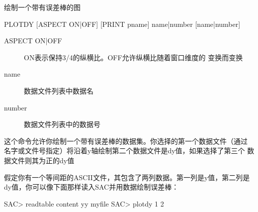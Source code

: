 \label{cmd:plotdy}

绘制一个带有误差棒的图

\begin{SACSTX}
PLOTDY [ASPECT ON|OFF] [PRINT pname] name|number [name|number]
\end{SACSTX}

\begin{description}
\item [ASPECT ON|OFF] ON表示保持3/4的纵横比。OFF允许纵横比随着窗口维度的
    变换而变换
\item [name] 数据文件列表中数据名
\item [number] 数据文件列表中的数据号
\end{description}

这个命令允许你绘制一个带有误差棒的数据集。你选择的第一个数据文件（通过
名字或文件号指定）将沿着y轴绘制第二个数据文件是dy值，如果选择了第三个
数据文件则其为正的dy值

假定你有一个等间距的ASCII文件，其包含了两列数据。第一列是y值，第二列是
dy值，你可以像下面那样读入SAC并用数据绘制误差棒：
\begin{SACCode}
SAC> readtable content yy myfile
SAC> plotdy 1 2
\end{SACCode}
